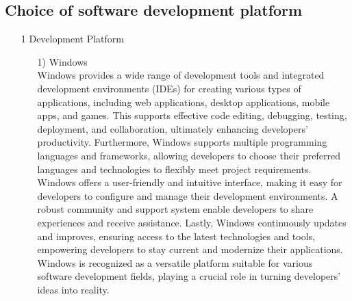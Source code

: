 \documentclass[conference]{IEEEtran}
\begin{document}
\subsection{Choice of software development platform}
\begin{enumerate}
\item[1] Development Platform

\begin{itemize}
\item [1)] Windows\\
Windows provides a wide range of development tools and integrated development environments (IDEs) for creating various types of applications, including web applications, desktop applications, mobile apps, and games. This supports effective code editing, debugging, testing, deployment, and collaboration, ultimately enhancing developers’ productivity. Furthermore, Windows supports multiple programming languages and frameworks, allowing developers to choose their preferred languages and technologies to flexibly meet project requirements. Windows offers a user-friendly and intuitive interface, making it easy for developers to configure and manage their development environments. A robust community and support system enable developers to share experiences and receive assistance. Lastly, Windows continuously updates and improves, ensuring access to the latest technologies and tools, empowering developers to stay current and modernize their applications. Windows is recognized as a versatile platform suitable for various software
development fields, playing a crucial role in turning developers’ ideas into reality. \\


\end{itemize}
\end{enumerate}
\end{document}
